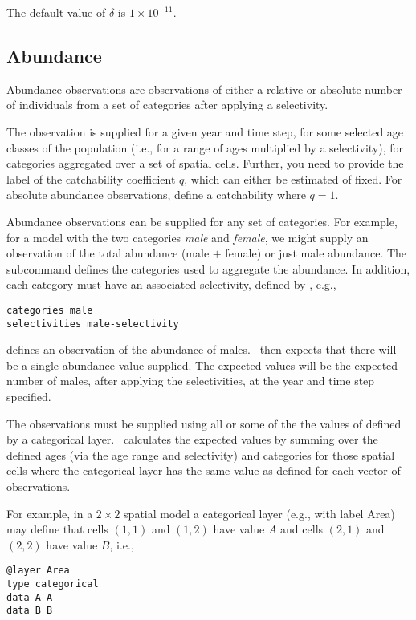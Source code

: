 The default value of $\delta$ is $1 \times 10^{-11}$.

\subsection{Abundance}

Abundance observations are observations of either a relative or absolute number of individuals from a set of categories after applying a selectivity. 

The observation is supplied for a given year and time step, for some selected age classes of the population (i.e., for a range of ages multiplied by a selectivity), for categories aggregated over a set of spatial cells. Further, you need to provide the label of the catchability coefficient $q$, which can either be estimated of fixed. For absolute abundance observations, define a catchability where $q=1$.

Abundance observations can be supplied for any set of categories. For example, for a model with the two categories \emph{male} and \emph{female}, we might supply an observation of the total abundance (male $+$ female) or just male abundance. The subcommand  defines the categories used to aggregate the abundance. In addition, each category must have an associated selectivity, defined by , e.g., 

\begin{verbatim}
categories male
selectivities male-selectivity
\end{verbatim}

defines an observation of the abundance of males. \SPM\ then expects that there will be a single abundance value supplied. The expected values will be the expected number of males, after applying the selectivities, at the year and time step specified. 

The observations must be supplied using all or some of the the values of defined by a categorical layer. \SPM\ calculates the expected values by summing over the defined ages (via the age range and selectivity) and categories for those spatial cells where the categorical layer has the same value as defined for each vector of observations.

For example, in a $2 \times 2$ spatial model a categorical layer (e.g., with label Area) may define that cells $(1,1)$ and $(1,2)$ have value $A$ and cells $(2,1)$ and $(2,2)$ have value $B$, i.e.,

\begin{verbatim}
@layer Area
type categorical
data A A 
data B B
\end{verbatim}


